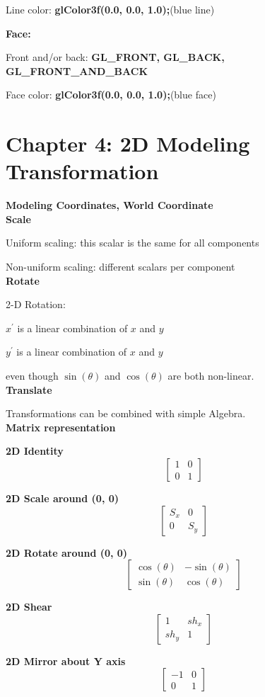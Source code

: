 \documentclass[]{report}
\begin{document}
Line color: \textbf{glColor3f(0.0, 0.0, 1.0);}(blue line)

\textbf{Face:}

Front and/or back: \textbf{GL\_FRONT, GL\_BACK, GL\_FRONT\_AND\_BACK}

Face color: \textbf{glColor3f(0.0, 0.0, 1.0);}(blue face)


\section*{Chapter 4: 2D Modeling Transformation}
\textbf{Modeling Coordinates, World Coordinate}
\\
\textbf{Scale}

Uniform scaling: this scalar is the same for all
components

Non-uniform scaling: different scalars per component\\
\textbf{Rotate}

2-D Rotation: 

$x^{'}$ is a linear combination of $x$ and $y$

$y^{'}$ is a linear combination of $x$ and $y$

even though $\sin(\theta)$ and $\cos(\theta)$ are both non-linear.\\
\textbf{Translate}

Transformations can be combined with simple Algebra.\\
\textbf{Matrix representation}

\textbf{2D Identity}
$$
\begin{bmatrix}
1 & 0\\
0 & 1
\end{bmatrix}
$$

\textbf{2D Scale around (0, 0)}
$$
\begin{bmatrix}
S_{x} & 0\\
0 & S_{y}
\end{bmatrix}
$$

\textbf{2D Rotate around (0, 0)}
$$
\begin{bmatrix}
\cos(\theta) & -\sin(\theta)\\
\sin(\theta) & \cos(\theta)
\end{bmatrix}
$$

\textbf{2D Shear}
$$
\begin{bmatrix}
1 & sh_{x}\\
sh_{y} & 1
\end{bmatrix}
$$

\textbf{2D Mirror about Y axis}
$$
\begin{bmatrix}
-1 & 0\\
0 & 1
\end{bmatrix}
$$
\end{document}
